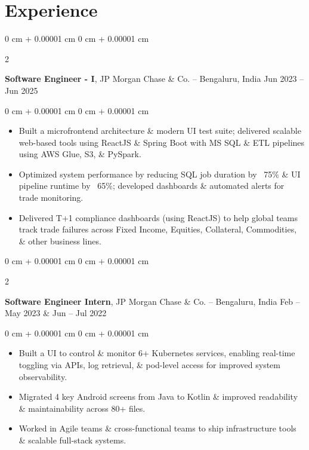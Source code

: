\documentclass[10pt, a4paper]{article}
\newenvironment{highlights}{
    \begin{itemize}[
        topsep=0.10 cm,
        parsep=0.10 cm,
        partopsep=0pt,
        itemsep=0pt,
        leftmargin=0 cm + 10pt
    ]
}{
    \end{itemize}
} %
\newenvironment{onecolentry}{
    \begin{adjustwidth}{
        0 cm + 0.00001 cm
    }{
        0 cm + 0.00001 cm
    }
}{
    \end{adjustwidth}
} %
\newenvironment{twocolentry}[2][]{
    \onecolentry
    \def\secondColumn{#2}
    \setcolumnwidth{\fill, 6.0 cm}
    \begin{paracol}{2}
}{
    \switchcolumn \raggedleft \secondColumn
    \end{paracol}
    \endonecolentry
} %
\begin{document}
    \section{Experience}
        \begin{twocolentry}{
            Jun 2023 – Jun 2025
        }
            \textbf{Software Engineer - I}, JP Morgan Chase \& Co. -- Bengaluru, India\end{twocolentry}
        \vspace{0.10 cm}
        \begin{onecolentry}
            \begin{highlights}
                \item Built a microfrontend architecture \& modern UI test suite; delivered scalable web-based tools using ReactJS \& Spring Boot with MS SQL \& ETL pipelines using AWS Glue, S3, \& PySpark.
                \item Optimized system performance by reducing SQL job duration by ~75\% \& UI pipeline runtime by ~65\%; developed dashboards \& automated alerts for trade monitoring.
                \item Delivered T+1 compliance dashboards (using ReactJS) to help global teams track trade failures across Fixed Income, Equities, Collateral, Commodities, \& other business lines.
            \end{highlights}
        \end{onecolentry}


        \vspace{0.15 cm}

        \begin{twocolentry}{
            Feb – May 2023 \& Jun – Jul 2022
        }
            \textbf{Software Engineer Intern}, JP Morgan Chase \& Co. -- Bengaluru, India\end{twocolentry}

        \vspace{0.10 cm}
        \begin{onecolentry}
            \begin{highlights}
                \item Built a UI to control \& monitor 6+ Kubernetes services, enabling real-time toggling via APIs, log retrieval, \& pod-level access for improved system observability.
                \item Migrated 4 key Android screens from Java to Kotlin \& improved readability \& maintainability across 80+ files.
                \item Worked in Agile teams \& cross-functional teams to ship infrastructure tools \& scalable full-stack systems.
            \end{highlights}
        \end{onecolentry}
    
\end{document}
